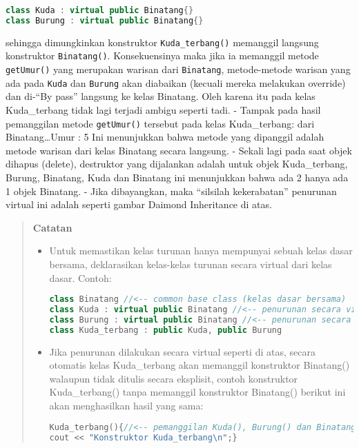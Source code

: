 \begin{lstlisting}[language=c++, numbers=none]
class Kuda : virtual public Binatang{}
class Burung : virtual public Binatang{}
\end{lstlisting}

sehingga dimungkinkan konstruktor \texttt{Kuda\_terbang()} memanggil
langsung konstruktor \texttt{Binatang()}. Konsekuensinya maka jika ia
memanggil metode \texttt{getUmur()} yang merupakan warisan dari
\texttt{Binatang}, metode-metode warisan yang ada pada \texttt{Kuda} dan
\texttt{Burung} akan diabaikan (kecuali mereka melakukan override) dan
di-``By pass'' langsung ke kelas Binatang. Oleh karena itu pada kelas
Kuda\_terbang tidak lagi terjadi ambigu seperti tadi. - Tampak pada
hasil pemanggilan metode \texttt{getUmur()} tersebut pada kelas
Kuda\_terbang: dari Binatang\ldots{}Umur : 5 Ini menunjukkan bahwa
metode yang dipanggil adalah metode warisan dari kelas Binatang secara
langsung. - Sekali lagi pada saat objek dihapus (delete), destruktor
yang dijalankan adalah untuk objek Kuda\_terbang, Burung, Binatang, Kuda
dan Binatang ini menunjukkan bahwa ada 2 hanya ada 1 objek Binatang. -
Jika dibayangkan, maka ``silsilah kekerabatan'' penurunan virtual ini
adalah seperti gambar Daimond Inheritance di atas.

\begin{quotation}
 {\LARGE {}} \textbf{Catatan}
	
\begin{itemize}
\item [\ding{45}] Untuk memastikan kelas turunan hanya mempunyai sebuah kelas dasar bersama,
deklarasikan kelas-kelas turunan secara virtual dari kelas dasar. Contoh:

\begin{lstlisting}[language=c++, numbers=none]
class Binatang //<-- common base class (kelas dasar bersama)
class Kuda : virtual public Binatang //<-- penurunan secara virtual
class Burung : virtual public Binatang //<-- penurunan secara virtual
class Kuda_terbang : public Kuda, public Burung
\end{lstlisting}

\item [\ding{45}] Jika penurunan dilakukan secara virtual seperti di atas, secara otomatis kelas
Kuda\_terbang akan memanggil konstruktor Binatang() walaupun tidak ditulis
secara eksplisit, contoh konstruktor Kuda\_terbang() tanpa memanggil konstruktor
Binatang() berikut ini akan menghasilkan hasil yang sama:
		
\begin{lstlisting}[language=c++, numbers=none]
Kuda_terbang(){//<-- pemanggilan Kuda(), Burung() dan Binatang() implisit
cout << "Konstruktor Kuda_terbang\n";}
\end{lstlisting}
\end{itemize}

\end{quotation}




